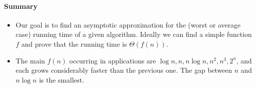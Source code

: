 \paragraph{Summary}
\begin{itemize}
\item Our goal is to find an asymptotic approximation for the (worst or average 
case) running time of a given algorithm. Ideally we can find a simple function 
$f$ and prove that the running time is $\Theta(f(n))$.
\item The main $f(n)$ occurring in applications are $\log n, n, n \log n, n^2, n^3, 2^n$, and 
each grows considerably faster than the previous one. The gap between $n$ and 
$n\log n$ is the smallest.
\end{itemize}